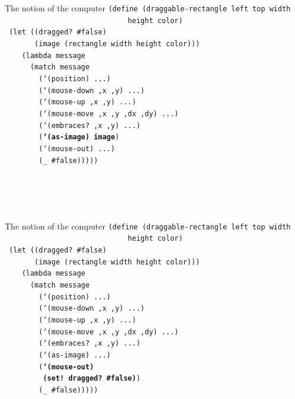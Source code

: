 \documentclass{beamer}
\begin{document}
\begin{frame}{The notion of the computer}
  \small
  \texttt{(define (draggable-rectangle left top width \\
    \ \ \ \ \ \ \ \ \ \ \ \ \ \ \ \ \ \ \ \ \ \ \ \ \ \ \ \ \ height color)\\
    \ (let ((dragged? \#false)\\
  \ \ \ \ \ \ \ (image (rectangle width height color)))\\
  \ \ \ \ (lambda message\\
  \ \ \ \ \ \ (match message\\
  \ \ \ \ \ \ \ \ (`(position) ...)\\
  \ \ \ \ \ \ \ \ (`(mouse-down ,x ,y) ...)\\
  \ \ \ \ \ \ \ \ (`(mouse-up ,x ,y) ...)\\
  \ \ \ \ \ \ \ \ (`(mouse-move ,x ,y ,dx ,dy) ...)\\
  \ \ \ \ \ \ \ \ (`(embraces? ,x ,y) ...)\\
  \ \ \ \ \ \ \ \ (\textbf{`(as-image) image})\\
  \ \ \ \ \ \ \ \ (`(mouse-out) ...)\\
  \ \ \ \ \ \ \ \ (\_ \#false)))))\\
  \ \\
  \ \\
  \ \\
  \ 
}
\end{frame}


\begin{frame}{The notion of the computer}
  \small
  \texttt{(define (draggable-rectangle left top width \\
    \ \ \ \ \ \ \ \ \ \ \ \ \ \ \ \ \ \ \ \ \ \ \ \ \ \ \ \ \ height color)\\
    \ (let ((dragged? \#false)\\
  \ \ \ \ \ \ \ (image (rectangle width height color)))\\
  \ \ \ \ (lambda message\\
  \ \ \ \ \ \ (match message\\
  \ \ \ \ \ \ \ \ (`(position) ...)\\
  \ \ \ \ \ \ \ \ (`(mouse-down ,x ,y) ...)\\
  \ \ \ \ \ \ \ \ (`(mouse-up ,x ,y) ...)\\
  \ \ \ \ \ \ \ \ (`(mouse-move ,x ,y ,dx ,dy) ...)\\
  \ \ \ \ \ \ \ \ (`(embraces? ,x ,y) ...)\\
  \ \ \ \ \ \ \ \ (`(as-image) ...)\\
  \ \ \ \ \ \ \ \ (\textbf{`(mouse-out) \\
  \ \ \ \ \ \ \ \ \ (set! dragged? \#false)})\\
  \ \ \ \ \ \ \ \ (\_ \#false)))))\\
  \ \\
  \ \\
  \ 
}
\end{frame}
\end{document}
